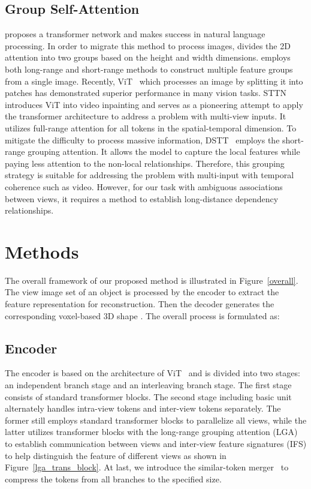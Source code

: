 \documentclass[10pt,twocolumn,letterpaper]{article}
\begin{document}
\subsection{Group Self-Attention}
\cite{vaswani2017attention} proposes a transformer network and makes success in natural language processing. In order to migrate this method to process images, \cite{Fwang2020axial} divides the 2D attention into two groups based on the height and width dimensions. \cite{huang2019interlaced} employs both long-range and short-range methods to construct multiple feature groups from a single image. Recently, ViT~\cite{dosovitskiy2021image} which processes an image by splitting it into patches has demonstrated superior performance in many vision tasks. STTN~\cite{zeng2020learning} introduces ViT into video inpainting and serves as a pioneering attempt to apply the transformer architecture to address a problem with multi-view inputs. It utilizes full-range attention for all tokens in the spatial-temporal dimension. To mitigate the difficulty to process massive information, DSTT~\cite{liu2021decoupled} employs the short-range grouping attention. It allows the model to capture the local features while paying less attention to the non-local relationships. Therefore, this grouping strategy is suitable for addressing the problem with multi-input with temporal coherence such as video. However, for our task with ambiguous associations between views, it requires a method to establish long-distance dependency relationships.

\section{Methods}

The overall framework of our proposed method is illustrated in Figure~\ref{overall}. The view image set of an object  is processed by the encoder  to extract the feature representation for reconstruction. Then the decoder  generates the corresponding voxel-based 3D shape . The overall process is formulated as:


\subsection{Encoder}

The encoder is based on the architecture of ViT~\cite{dosovitskiy2021image} and is divided into two stages: an independent branch stage and an interleaving branch stage. The first stage consists of  standard transformer blocks. The second stage including  basic unit alternately handles intra-view tokens and inter-view tokens separately. The former still employs standard transformer blocks to parallelize all views, while the latter utilizes transformer blocks with the long-range grouping attention (LGA) to establish communication between views and inter-view feature signatures (IFS) to help distinguish the feature of different views as shown in Figure~\ref{lga_trans_block}. At last, we introduce the similar-token merger~\cite{zhu2023umi} to compress the tokens from all branches to the specified size.
\end{document}
